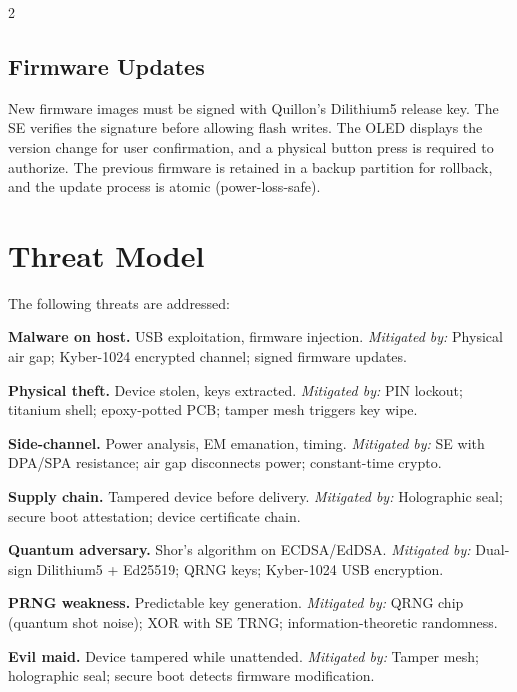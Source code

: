 \documentclass[11pt,a4paper]{article}
\begin{document}
\begin{multicols}{2}
\subsection{Firmware Updates}

New firmware images must be signed with Quillon's Dilithium5 release key.
The SE verifies the signature before allowing flash writes. The OLED
displays the version change for user confirmation, and a physical button
press is required to authorize. The previous firmware is retained in a
backup partition for rollback, and the update process is atomic
(power-loss-safe).

\section{Threat Model}

The following threats are addressed:

\smallskip
\noindent\textbf{Malware on host.} USB exploitation, firmware injection.
\textit{Mitigated by:} Physical air gap; Kyber-1024 encrypted channel;
signed firmware updates.

\smallskip
\noindent\textbf{Physical theft.} Device stolen, keys extracted.
\textit{Mitigated by:} PIN lockout; titanium shell; epoxy-potted PCB;
tamper mesh triggers key wipe.

\smallskip
\noindent\textbf{Side-channel.} Power analysis, EM emanation, timing.
\textit{Mitigated by:} SE with DPA/SPA resistance; air gap disconnects
power; constant-time crypto.

\smallskip
\noindent\textbf{Supply chain.} Tampered device before delivery.
\textit{Mitigated by:} Holographic seal; secure boot attestation;
device certificate chain.

\smallskip
\noindent\textbf{Quantum adversary.} Shor's algorithm on ECDSA/EdDSA.
\textit{Mitigated by:} Dual-sign Dilithium5 + Ed25519; QRNG keys;
Kyber-1024 USB encryption.

\smallskip
\noindent\textbf{PRNG weakness.} Predictable key generation.
\textit{Mitigated by:} QRNG chip (quantum shot noise); XOR with SE TRNG;
information-theoretic randomness.

\smallskip
\noindent\textbf{Evil maid.} Device tampered while unattended.
\textit{Mitigated by:} Tamper mesh; holographic seal; secure boot detects
firmware modification.


\end{multicols}
\end{document}
